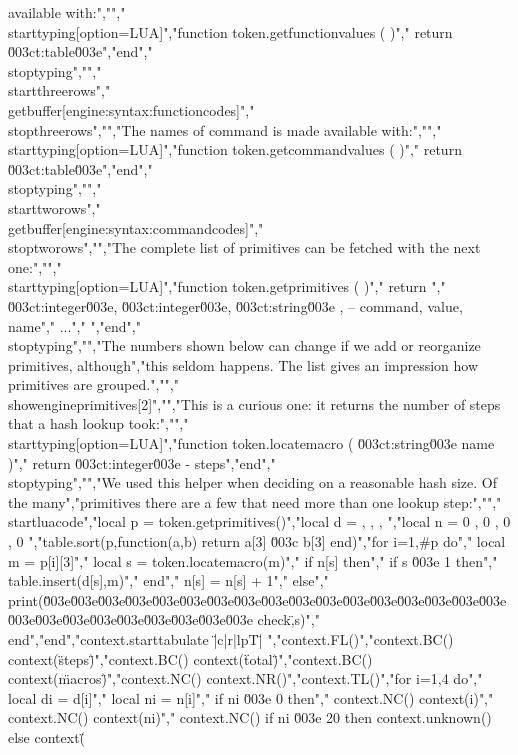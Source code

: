 available with:","","\\starttyping[option=LUA]","function token.getfunctionvalues ( )","    return \u003ct:table\u003e","end","\\stoptyping","","\\startthreerows","\\getbuffer[engine:syntax:functioncodes]","\\stopthreerows","","The names of command is made available with:","","\\starttyping[option=LUA]","function token.getcommandvalues ( )","    return \u003ct:table\u003e","end","\\stoptyping","","\\starttworows","\\getbuffer[engine:syntax:commandcodes]","\\stoptworows","","The complete list of primitives can be fetched with the next one:","","\\starttyping[option=LUA]","function token.getprimitives ( )","    return {","        { \u003ct:integer\u003e, \u003ct:integer\u003e, \u003ct:string\u003e }, -- command, value, name","        ...","    }","end","\\stoptyping","","The numbers shown below can change if we add or reorganize primitives, although","this seldom happens. The list gives an impression how primitives are grouped.","","\\showengineprimitives[2]","","This is a curious one: it returns the number of steps that a hash lookup took:","","\\starttyping[option=LUA]","function token.locatemacro ( \u003ct:string\u003e name )","    return \u003ct:integer\u003e - steps","end","\\stoptyping","","We used this helper when deciding on a reasonable hash size. Of the many","primitives there are a few that need more than one lookup step:","","\\startluacode","local p = token.getprimitives()","local d = { { }, { }, { }, { } }","local n = {  0 ,  0 ,  0 ,  0  }","table.sort(p,function(a,b) return a[3] \u003c b[3] end)","for i=1,#p do","    local m = p[i][3]","    local s = token.locatemacro(m)","    if n[s] then","        if s \u003e 1 then","            table.insert(d[s],m)","        end","        n[s] = n[s] + 1","    else","        print(\"\u003e\u003e\u003e\u003e\u003e\u003e\u003e\u003e\u003e\u003e\u003e\u003e\u003e\u003e\u003e\u003e\u003e\u003e\u003e\u003e\u003e\u003e\u003e\u003e\u003e\u003e check\",s)","    end","end","context.starttabulate { \"|c|r|lpT|\" }","context.FL()","context.BC() context(\"steps\")","context.BC() context(\"total\")","context.BC() context(\"macros\")","context.NC() context.NR()","context.TL()","for i=1,4 do","    local di = d[i]","    local ni = n[i]","    if ni \u003e 0 then","        context.NC() context(i)","        context.NC() context(ni)","        context.NC() if ni \u003e 20 then context.unknown() else context(\"%